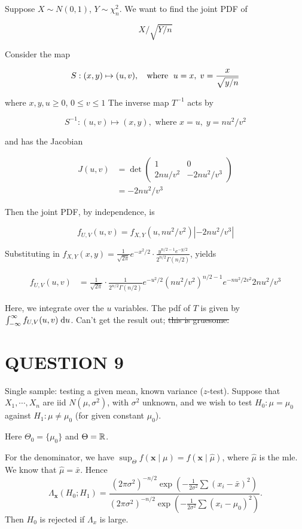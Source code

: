 \documentclass[a4paper]{article}
\begin{document}
Suppose $ X \sim N(0,1) $, $ Y \sim \chi_{n}^{2}  $. We want to find the joint PDF of

\[ X / \sqrt{Y/n} \]

Consider the map 

\[ S: (x,y) \mapsto (u,v), \text{ \; where \;} u = x, \; v = \frac{x}{\sqrt{y/n}} \]

where $ x,y,u \geq 0 $, $ 0 \leq v \leq 1 $ The inverse map $ T^{-1} $ acts by

\[ S^{-1}: (u,v) \mapsto (x,y), \text{ where } x = u, \; y = nu^{2}/v^{2} \]

and has the Jacobian

\begin{align*}
J(u,v) & = \det \begin{pmatrix}
1 & 0 \\
2nu/v^{2} & -2nu^{2} / v^{3} 
\end{pmatrix}  \\
& = -2nu^{2} / v^{3} 
\end{align*}

Then the joint PDF, by independence, is

\[ f_{U,V}(u,v) = f_{X,Y}(u,nu^{2}/v^{2})\left| -2nu^{2} / v^{3}  \right|  \]

Substituting in $ f_{X,Y}(x,y) = \frac{1}{\sqrt{2\pi}} e^{-x^{2}/2} \cdot \frac{y^{n/2 - 1} e^{-y/2} }{2^{n/2} \Gamma(n/2)}  $, yields

\begin{align*}
f_{U,V}(u,v) & = \frac{1}{\sqrt{2\pi}}  \cdot \frac{1}{2^{n/2} \Gamma(n/2)} e^{-u^{2}/2} (nu^{2}/v^{2})^{n/2 - 1} e^{-nu^{2}/2v^{2}} 2nu^{2}/v^{3}
\end{align*}

Here, we integrate over the $ u $ variables. The pdf of $ T $ is given by $ \int_{-\infty}^{\infty} f_{U,V}(u,v) \; \mathrm{d} u $. Can't get the result out; \st{this is gruesome.}


\section{QUESTION 9}

Single sample: testing a given mean, known variance ($z$-test). Suppose that $X_1, \cdots, X_n$ are iid $N(\mu, \sigma^2)$, with $\sigma^2$ unknown, and we wish to test $H_0: \mu = \mu_0$ against $H_1: \mu \not= \mu_0$ (for given constant $\mu_0$).

Here $\Theta_0 = \{\mu_0\}$ and $\Theta = \mathbb{R}$.

For the denominator, we have $\sup_\Theta f(\mathbf{x}\mid \mu) = f(\mathbf{x}\mid \hat{\mu})$, where $\hat{\mu}$ is the mle. We know that $\hat{\mu} = \bar x$. Hence
\[
\Lambda_\mathbf{x}(H_0; H_1) = \frac{(2\pi\sigma^2)^{-n/2}\exp\left(-\frac{1}{2\sigma^2}\sum(x_i - \bar x)^2\right)}{(2\pi\sigma^2)^{-n/2}\exp\left(-\frac{1}{2\sigma^2}\sum(x_i - \mu_0)^2\right)}.
\]
Then $H_0$ is rejected if $\Lambda_x$ is large.
\end{document}
